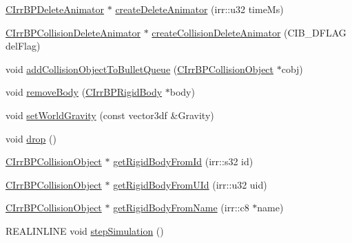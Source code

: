 \begin{DoxyCompactItemize}
\item 
\hyperlink{class_c_irr_b_p_delete_animator}{CIrrBPDeleteAnimator} $\ast$ \hyperlink{class_c_irr_b_p_manager_a34d992b091c917aa9a0febddadf26141}{createDeleteAnimator} (irr::u32 timeMs)
\item 
\hyperlink{class_c_irr_b_p_collision_delete_animator}{CIrrBPCollisionDeleteAnimator} $\ast$ \hyperlink{class_c_irr_b_p_manager_a868af77531e0eb62d14ee060d2c91158}{createCollisionDeleteAnimator} (CIB\_\-DFLAG delFlag)
\item 
void \hyperlink{class_c_irr_b_p_manager_a58e4019b664a6f3be5500394c4950206}{addCollisionObjectToBulletQueue} (\hyperlink{class_c_irr_b_p_collision_object}{CIrrBPCollisionObject} $\ast$cobj)
\item 
void \hyperlink{class_c_irr_b_p_manager_ad4896d9448a572add3c84ca5118c6baa}{removeBody} (\hyperlink{class_c_irr_b_p_rigid_body}{CIrrBPRigidBody} $\ast$body)
\item 
void \hyperlink{class_c_irr_b_p_manager_ad3eea990a27f0ce4cfc2564c475f55f2}{setWorldGravity} (const vector3df \&Gravity)
\item 
void \hyperlink{class_c_irr_b_p_manager_ab82cddba1a3acd79119e2708680acffb}{drop} ()
\item 
\hyperlink{class_c_irr_b_p_collision_object}{CIrrBPCollisionObject} $\ast$ \hyperlink{class_c_irr_b_p_manager_a0dd849ddab18d640c2dff7847d305ac4}{getRigidBodyFromId} (irr::s32 id)
\item 
\hyperlink{class_c_irr_b_p_collision_object}{CIrrBPCollisionObject} $\ast$ \hyperlink{class_c_irr_b_p_manager_a98905295ca376a5ab08e2e1fe13a17fe}{getRigidBodyFromUId} (irr::u32 uid)
\item 
\hyperlink{class_c_irr_b_p_collision_object}{CIrrBPCollisionObject} $\ast$ \hyperlink{class_c_irr_b_p_manager_a60406c7bd5c47ca75e46585644db3e0b}{getRigidBodyFromName} (irr::c8 $\ast$name)
\item 
REALINLINE void \hyperlink{class_c_irr_b_p_manager_ae058cbb1d7ed8c4c3813a7205c7f2d9d}{stepSimulation} ()
\end{DoxyCompactItemize}


